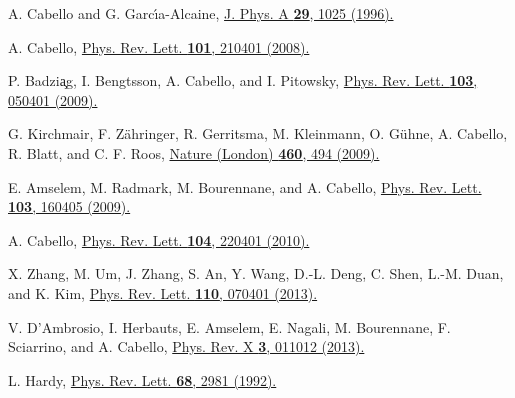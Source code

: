 \documentclass[%
  twocolumn,
 showpacs,
 showkeys,
 preprintnumbers,
 amsmath,amssymb,
 aps,
  pra,
  longbibliography,
 floatfix,
 ]{revtex4-1}
\begin{document}
\begin{thebibliography}{99}
 A. Cabello and G. Garc\'{\i}a-Alcaine,
 \href{http://iopscience.iop.org/0305-4470/29/5/016/}{J. Phys. A \textbf{29}, 1025 (1996).}

 A. Cabello,
 \href{http://journals.aps.org/prl/abstract/10.1103/PhysRevLett.101.210401}{Phys. Rev. Lett. \textbf{101}, 210401 (2008).}

 P. Badzi{\c a}g, I. Bengtsson, A. Cabello, and I. Pitowsky,
 \href{http://journals.aps.org/prl/abstract/10.1103/PhysRevLett.103.050401}{Phys. Rev. Lett. \textbf{103}, 050401 (2009).}

 G. Kirchmair, F. Z\"{a}hringer, R. Gerritsma, M. Kleinmann, O. G\"{u}hne, A. Cabello, R. Blatt, and C. F. Roos,
 \href{http://www.nature.com/nature/journal/v460/n7254/full/nature08172.html}{Nature (London) \textbf{460}, 494 (2009).}

 E. Amselem, M. R{a}dmark, M. Bourennane, and A. Cabello,
 \href{http://journals.aps.org/prl/abstract/10.1103/PhysRevLett.103.160405}{Phys. Rev. Lett. \textbf{103}, 160405 (2009).}

 A. Cabello,
 \href{http://journals.aps.org/prl/abstract/10.1103/PhysRevLett.104.220401}{Phys. Rev. Lett. \textbf{104}, 220401 (2010).}

 X. Zhang, M. Um, J. Zhang, S. An, Y. Wang, D.-L. Deng, C. Shen, L.-M. Duan, and K. Kim,
 \href{http://prl.aps.org/abstract/PRL/v110/i7/e070401}{Phys. Rev. Lett. \textbf{110}, 070401 (2013).}

 V. D'Ambrosio, I. Herbauts, E. Amselem, E. Nagali, M. Bourennane, F. Sciarrino, and A. Cabello,
 \href{http://prx.aps.org/abstract/PRX/v3/i1/e011012}{Phys. Rev. X \textbf{3}, 011012 (2013).}

 L. Hardy,
 \href{http://prl.aps.org/abstract/PRL/v68/i20/p2981_1}{Phys. Rev. Lett. \textbf{68}, 2981 (1992).}


\end{thebibliography}
\end{document}
